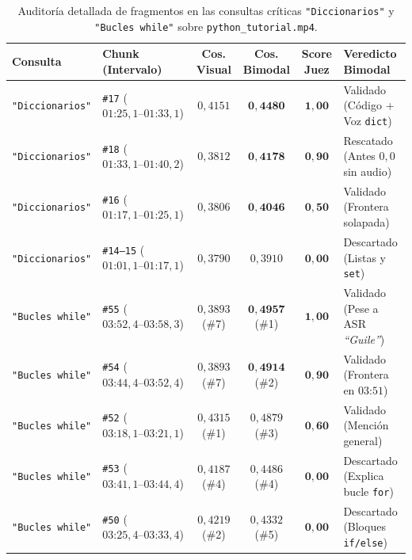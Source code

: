 \begin{table}[htbp]
\centering
\small
\renewcommand{\arraystretch}{1.15}
\setlength{\tabcolsep}{3.5pt}
\caption{Auditoría detallada de fragmentos en las consultas críticas \texttt{"Diccionarios"} y \texttt{"Bucles while"} sobre \texttt{python\_tutorial.mp4}.} %
\label{tab:micro_analisis_consultas_criticas}
\begin{tabularx}{\linewidth}{llccc>{\raggedright\arraybackslash}X}
\toprule
\textbf{Consulta} & \textbf{Chunk (Intervalo)} & \textbf{Cos. Visual} & \textbf{Cos. Bimodal} & \textbf{Score Juez} & \textbf{Veredicto Bimodal} \\
\midrule
\texttt{"Diccionarios"} & \texttt{\#17} ($01\text{:}25{,}1\text{--}01\text{:}33{,}1$) & $0{,}4151$ & $\mathbf{0{,}4480}$ & $\mathbf{1{,}00}$ & Validado (Código + Voz \texttt{dict}) \\
\texttt{"Diccionarios"} & \texttt{\#18} ($01\text{:}33{,}1\text{--}01\text{:}40{,}2$) & $0{,}3812$ & $\mathbf{0{,}4178}$ & $\mathbf{0{,}90}$ & Rescatado (Antes $0{,}0$ sin audio) \\
\texttt{"Diccionarios"} & \texttt{\#16} ($01\text{:}17{,}1\text{--}01\text{:}25{,}1$) & $0{,}3806$ & $\mathbf{0{,}4046}$ & $\mathbf{0{,}50}$ & Validado (Frontera solapada) \\
\texttt{"Diccionarios"} & \texttt{\#14--15} ($01\text{:}01{,}1\text{--}01\text{:}17{,}1$) & $0{,}3790$ & $0{,}3910$ & $\mathbf{0{,}00}$ & Descartado (Listas y \texttt{set}) \\
\midrule
\texttt{"Bucles while"} & \texttt{\#55} ($03\text{:}52{,}4\text{--}03\text{:}58{,}3$) & $0{,}3893$ (\#7) & $\mathbf{0{,}4957}$ (\#1) & $\mathbf{1{,}00}$ & Validado (Pese a ASR \textit{``Guile''}) \\
\texttt{"Bucles while"} & \texttt{\#54} ($03\text{:}44{,}4\text{--}03\text{:}52{,}4$) & $0{,}3893$ (\#7) & $\mathbf{0{,}4914}$ (\#2) & $\mathbf{0{,}90}$ & Validado (Frontera en $03\text{:}51$) \\
\texttt{"Bucles while"} & \texttt{\#52} ($03\text{:}18{,}1\text{--}03\text{:}21{,}1$) & $0{,}4315$ (\#1) & $0{,}4879$ (\#3) & $\mathbf{0{,}60}$ & Validado (Mención general) \\
\texttt{"Bucles while"} & \texttt{\#53} ($03\text{:}41{,}1\text{--}03\text{:}44{,}4$) & $0{,}4187$ (\#4) & $0{,}4486$ (\#4) & $\mathbf{0{,}00}$ & Descartado (Explica bucle \texttt{for}) \\
\texttt{"Bucles while"} & \texttt{\#50} ($03\text{:}25{,}4\text{--}03\text{:}33{,}4$) & $0{,}4219$ (\#2) & $0{,}4332$ (\#5) & $\mathbf{0{,}00}$ & Descartado (Bloques \texttt{if/else}) \\
\bottomrule
\end{tabularx}
\end{table}

